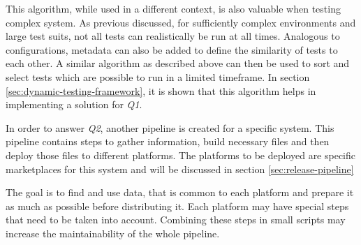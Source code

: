 This algorithm, while used in a different context, is also valuable when testing complex system.
As previous discussed, for sufficiently complex environments and large test suits, not all tests can realistically be run at all times.
Analogous to configurations, metadata can also be added to define the similarity of tests to each other.
A similar algorithm as described above can then be used to sort and select tests which are possible to run in a limited timeframe.
In section \ref{sec:dynamic-testing-framework}, it is shown that this algorithm helps in implementing a solution for \textit{Q1}.

In order to answer \textit{Q2}, another pipeline is created for a specific system.
This pipeline contains steps to gather information, build necessary files and then deploy those files to different platforms.
The platforms to be deployed are specific marketplaces for this system and will be discussed in section \ref{sec:release-pipeline}

The goal is to find and use data, that is common to each platform and prepare it as much as possible before distributing it.
Each platform may have special steps that need to be taken into account.
Combining these steps in small scripts may increase the maintainability of the whole pipeline.
